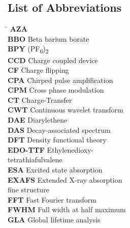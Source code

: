 \documentclass[12pt]{ut-thesis}
\begin{document}
\begin{preliminary}
    \newpage
    \chapter*{List of Abbreviations}

    \begin{multicols}{2}

    \begin{tabbing}
      \hspace*{2.5cm} \= \kill
      \textbf{AZA} \\
      \textbf{BBO} \> Beta barium borate \\
      \textbf{BPY} (PF\textsubscript{6})\textsubscript{2}\\
      \textbf{CCD} \> Charge coupled device \\
      \textbf{CF} \> Charge flipping \\
      \textbf{CPA} \> Chirped pulse amplification \\
      \textbf{CPM} \> Cross phase modulation \\
      \textbf{CT} \> Charge-Transfer \\
      \textbf{CWT} \> Continuous wavelet transform \\
      \textbf{DAE} \> Diarylethene \\
      \textbf{DAS} \> Decay-associated spectrum \\
      \textbf{DFT} \> Density functional theory \\
      \textbf{EDO-TTF} \> Ethylenedioxy- \\
        \> tetrathiafulvalene\\
      \textbf{ESA} \> Excited state absorption\\
      \textbf{EXAFS} \> Extended X-ray absorption \\
        \> fine structure\\
      \textbf{FFT} \> Fast Fourier transform \\
      \textbf{FWHM} \> Full width at half maximum \\
      \textbf{GLA} \> Global lifetime analysis \\

\end{tabbing}
\end{multicols}
\end{preliminary}
\end{document}
